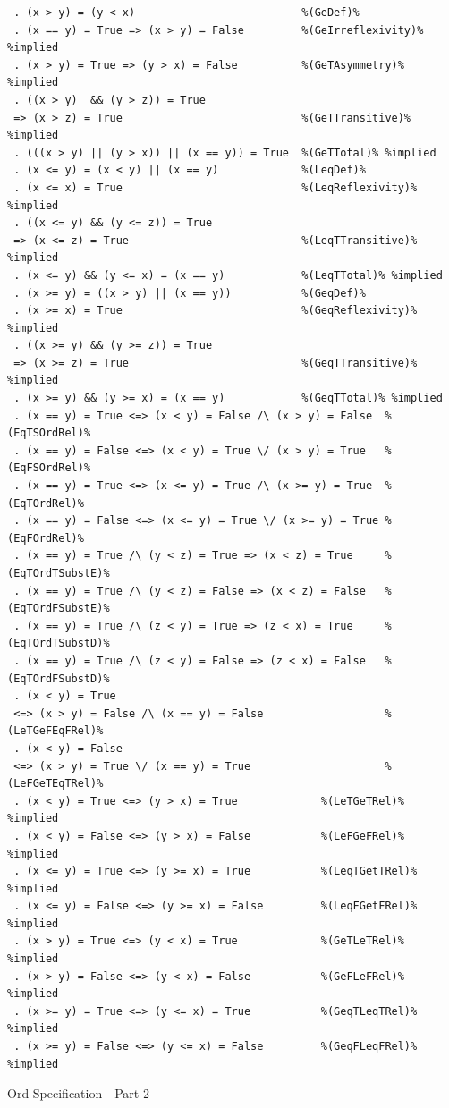 \documentclass[12pt,twoside]{article}
\numberwithin{spec}{subsection}
\numberwithin{proof}{subsection}
\numberwithin{figure}{subsection}
\numberwithin{code}{subsection}
\begin{document}
\addtocounter{spec}{-1}
\begin{spec}
\begin{verbatim}
 . (x > y) = (y < x)                          %(GeDef)%
 . (x == y) = True => (x > y) = False         %(GeIrreflexivity)% %implied
 . (x > y) = True => (y > x) = False          %(GeTAsymmetry)% %implied
 . ((x > y)  && (y > z)) = True
 => (x > z) = True                            %(GeTTransitive)% %implied
 . (((x > y) || (y > x)) || (x == y)) = True  %(GeTTotal)% %implied
 . (x <= y) = (x < y) || (x == y)             %(LeqDef)%
 . (x <= x) = True                            %(LeqReflexivity)% %implied
 . ((x <= y) && (y <= z)) = True 
 => (x <= z) = True                           %(LeqTTransitive)% %implied
 . (x <= y) && (y <= x) = (x == y)            %(LeqTTotal)% %implied
 . (x >= y) = ((x > y) || (x == y))           %(GeqDef)%
 . (x >= x) = True                            %(GeqReflexivity)% %implied 
 . ((x >= y) && (y >= z)) = True
 => (x >= z) = True                           %(GeqTTransitive)% %implied
 . (x >= y) && (y >= x) = (x == y)            %(GeqTTotal)% %implied
 . (x == y) = True <=> (x < y) = False /\ (x > y) = False  %(EqTSOrdRel)%
 . (x == y) = False <=> (x < y) = True \/ (x > y) = True   %(EqFSOrdRel)%
 . (x == y) = True <=> (x <= y) = True /\ (x >= y) = True  %(EqTOrdRel)%
 . (x == y) = False <=> (x <= y) = True \/ (x >= y) = True %(EqFOrdRel)%
 . (x == y) = True /\ (y < z) = True => (x < z) = True     %(EqTOrdTSubstE)%
 . (x == y) = True /\ (y < z) = False => (x < z) = False   %(EqTOrdFSubstE)%
 . (x == y) = True /\ (z < y) = True => (z < x) = True     %(EqTOrdTSubstD)%
 . (x == y) = True /\ (z < y) = False => (z < x) = False   %(EqTOrdFSubstD)%
 . (x < y) = True 
 <=> (x > y) = False /\ (x == y) = False                   %(LeTGeFEqFRel)%
 . (x < y) = False 
 <=> (x > y) = True \/ (x == y) = True                     %(LeFGeTEqTRel)%
 . (x < y) = True <=> (y > x) = True             %(LeTGeTRel)% %implied
 . (x < y) = False <=> (y > x) = False           %(LeFGeFRel)% %implied
 . (x <= y) = True <=> (y >= x) = True           %(LeqTGetTRel)% %implied
 . (x <= y) = False <=> (y >= x) = False         %(LeqFGetFRel)% %implied
 . (x > y) = True <=> (y < x) = True             %(GeTLeTRel)% %implied
 . (x > y) = False <=> (y < x) = False           %(GeFLeFRel)% %implied
 . (x >= y) = True <=> (y <= x) = True           %(GeqTLeqTRel)% %implied
 . (x >= y) = False <=> (y <= x) = False         %(GeqFLeqFRel)% %implied
\end{verbatim}
\caption{Ord Specification - Part 2}
\end{spec}
\end{document}
